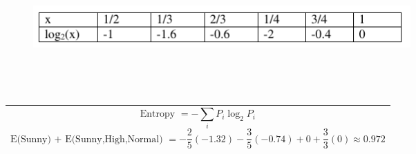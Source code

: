 \documentclass[10pt]{article}
\newenvironment{answer}
    {\begin{center}
    \begin{tabular}{|p{0.9\textwidth}|}
    \hline
    }
    { 
    \\\hline
    \end{tabular} 
    \end{center}
    }
\begin{document}
\begin{enumerate}
\begin{enumerate}
      \begin{figure}[h!]
        \centering
        \includegraphics[width=0.7\textwidth,height=5cm,keepaspectratio]{hw3_2.png}
      \end{figure}
      \begin{answer}
        \[ \textrm{Entropy } = -\sum_iP_i\log_2P_i \]
        \[ \textrm{E(Sunny) + E(Sunny,High,Normal) } = -\frac{2}{5}(-1.32) - \frac{3}{5}(-0.74) + 0 + \frac{3}{3}(0) \approx 0.972 \]
      \end{answer}


\end{enumerate}
\end{enumerate}
\end{document}
